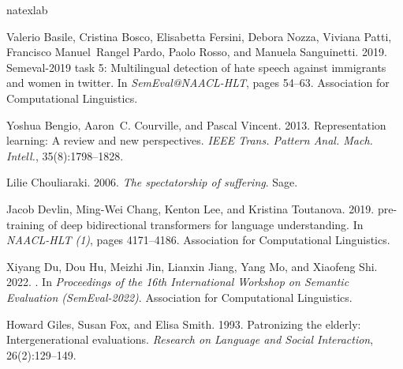 \documentclass[11pt]{article}
\begin{document}
\begin{thebibliography}{31}
    \expandafter\ifx\csname natexlab\endcsname\relax\def\natexlab#1{#1}\fi
    
    Valerio Basile, Cristina Bosco, Elisabetta Fersini, Debora Nozza, Viviana
      Patti, Francisco Manuel~Rangel Pardo, Paolo Rosso, and Manuela Sanguinetti.
      2019.
    \newblock Semeval-2019 task 5: Multilingual detection of hate speech against
      immigrants and women in twitter.
    \newblock In \emph{SemEval@NAACL-HLT}, pages 54--63. Association for
      Computational Linguistics.
    
    Yoshua Bengio, Aaron~C. Courville, and Pascal Vincent. 2013.
    \newblock Representation learning: {A} review and new perspectives.
    \newblock \emph{{IEEE} Trans. Pattern Anal. Mach. Intell.}, 35(8):1798--1828.
    
    Lilie Chouliaraki. 2006.
    \newblock \emph{The spectatorship of suffering}.
    \newblock Sage.
    
    Jacob Devlin, Ming{-}Wei Chang, Kenton Lee, and Kristina Toutanova. 2019.
     pre-training of deep bidirectional transformers for language
      understanding.
    \newblock In \emph{{NAACL-HLT} {(1)}}, pages 4171--4186. Association for
      Computational Linguistics.
    
    Xiyang Du, Dou Hu, Meizhi Jin, Lianxin Jiang, Yang Mo, and Xiaofeng Shi. 2022.
    .
    \newblock In \emph{Proceedings of the 16th International Workshop on Semantic
      Evaluation (SemEval-2022)}. Association for Computational Linguistics.
    
    Howard Giles, Susan Fox, and Elisa Smith. 1993.
    \newblock Patronizing the elderly: Intergenerational evaluations.
    \newblock \emph{Research on Language and Social Interaction}, 26(2):129--149.
    

\end{thebibliography}
\end{document}
